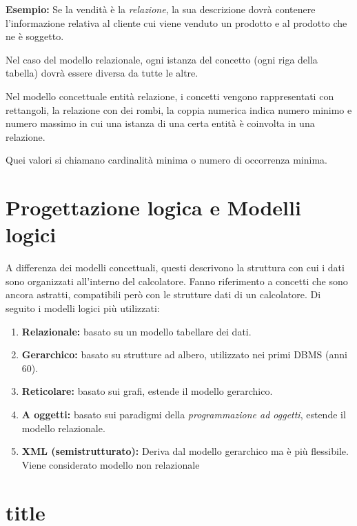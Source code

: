 \documentclass{article}
\begin{document}
\textbf{Esempio:} Se la vendità è la \textit{relazione}, la sua descrizione dovrà contenere l'informazione relativa al cliente cui viene venduto un prodotto e al prodotto che ne è soggetto.

Nel caso del modello relazionale, ogni istanza del concetto (ogni riga della tabella) dovrà essere diversa da tutte le altre.

Nel modello concettuale entità relazione, i concetti vengono rappresentati con rettangoli, la relazione con dei rombi, la coppia numerica indica numero minimo e numero massimo in cui una istanza di una certa entità è coinvolta in una relazione.


Quei valori si chiamano cardinalità minima o numero di occorrenza minima.

\section{Progettazione logica e Modelli logici}
A differenza dei modelli concettuali, questi descrivono la struttura con cui i dati sono organizzati all'interno del calcolatore. Fanno riferimento a concetti che sono ancora astratti, compatibili però con le strutture dati di un calcolatore. Di seguito i modelli logici più utilizzati:
\begin{enumerate}
  \item \textbf{Relazionale:} basato su un modello tabellare dei dati.
  \item \textbf{Gerarchico:} basato su strutture ad albero, utilizzato nei primi DBMS (anni 60).
  \item \textbf{Reticolare:} basato sui grafi, estende il modello gerarchico.
  \item \textbf{A oggetti:} basato sui paradigmi della \textit{programmazione ad oggetti}, estende il modello relazionale.
  \item \textbf{XML (semistrutturato):} Deriva dal modello gerarchico ma è più flessibile. Viene considerato modello non relazionale
\end{enumerate}

\section{title}
\end{document}
